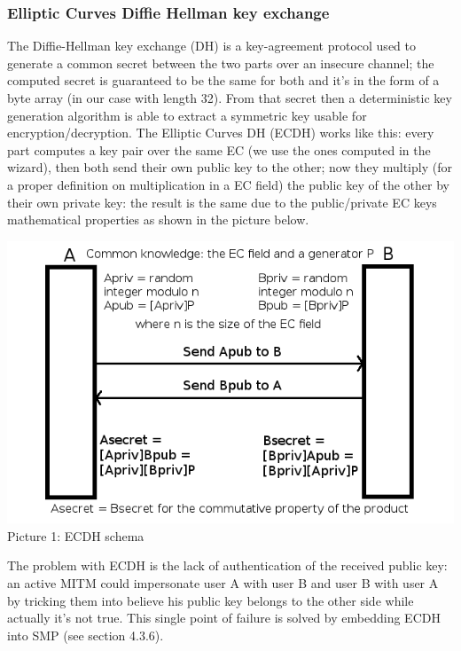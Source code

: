 \subsubsection{Elliptic Curves Diffie Hellman key exchange}
The Diffie-Hellman key exchange (DH) is a key-agreement protocol used to generate a common secret between the two parts over an insecure channel; the computed secret is guaranteed to be the same for both and it's in the form of a byte array (in our case with length 32). From that secret then a deterministic key generation algorithm is able to extract a symmetric key usable for encryption/decryption. The Elliptic Curves DH (ECDH) works like this: every part computes a key pair over the same EC (we use the ones computed in the wizard), then both send their own public key to the other; now they multiply (for a proper definition on multiplication in a EC field) the public key of the other by their own private key: the result is the same due to the public/private EC keys mathematical properties as shown in the picture below.\\

\vspace{1cm}
\begin{center}
\includegraphics[scale=0.7]{images/ecdh}\\

\vspace{1cm}
Picture 1: ECDH schema\\
\end{center}

\vspace{1cm}
The problem with ECDH is the lack of authentication of the received public key: an active MITM could impersonate user A with user B and user B with user A by tricking them into believe his public key belongs to the other side while actually it's not true. This single point of failure is solved by embedding ECDH into SMP (see section 4.3.6).